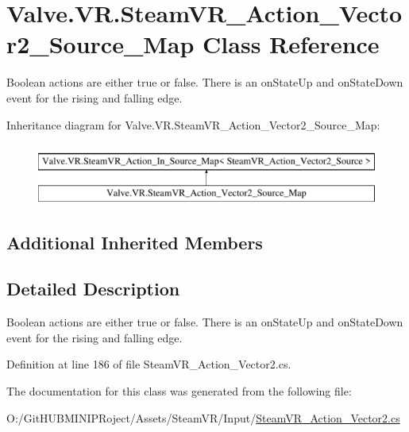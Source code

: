 \hypertarget{class_valve_1_1_v_r_1_1_steam_v_r___action___vector2___source___map}{}\section{Valve.\+V\+R.\+Steam\+V\+R\+\_\+\+Action\+\_\+\+Vector2\+\_\+\+Source\+\_\+\+Map Class Reference}
\label{class_valve_1_1_v_r_1_1_steam_v_r___action___vector2___source___map}


Boolean actions are either true or false. There is an on\+State\+Up and on\+State\+Down event for the rising and falling edge.  


Inheritance diagram for Valve.\+V\+R.\+Steam\+V\+R\+\_\+\+Action\+\_\+\+Vector2\+\_\+\+Source\+\_\+\+Map\+:\begin{figure}[H]
\begin{center}
\leavevmode
\includegraphics[height=2.000000cm]{class_valve_1_1_v_r_1_1_steam_v_r___action___vector2___source___map}
\end{center}
\end{figure}
\subsection*{Additional Inherited Members}


\subsection{Detailed Description}
Boolean actions are either true or false. There is an on\+State\+Up and on\+State\+Down event for the rising and falling edge. 



Definition at line 186 of file Steam\+V\+R\+\_\+\+Action\+\_\+\+Vector2.\+cs.



The documentation for this class was generated from the following file\+:\begin{DoxyCompactItemize}
\item 
O\+:/\+Git\+H\+U\+B\+M\+I\+N\+I\+P\+Roject/\+Assets/\+Steam\+V\+R/\+Input/\mbox{\hyperlink{_steam_v_r___action___vector2_8cs}{Steam\+V\+R\+\_\+\+Action\+\_\+\+Vector2.\+cs}}\end{DoxyCompactItemize}
